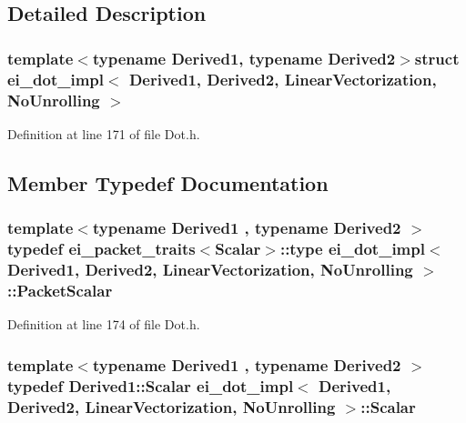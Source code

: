 \subsection{Detailed Description}
\subsubsection*{template$<$typename Derived1, typename Derived2$>$struct ei\-\_\-dot\-\_\-impl$<$ Derived1, Derived2, Linear\-Vectorization, No\-Unrolling $>$}



Definition at line 171 of file Dot.\-h.



\subsection{Member Typedef Documentation}
\hypertarget{structei__dot__impl_3_01_derived1_00_01_derived2_00_01_linear_vectorization_00_01_no_unrolling_01_4_aceef518270c80f1a170db132bd2c0122}{
\subsubsection[{Packet\-Scalar}]{\setlength{\rightskip}{0pt plus 5cm}template$<$typename Derived1 , typename Derived2 $>$ typedef {\bf ei\-\_\-packet\-\_\-traits}$<${\bf Scalar}$>$\-::{\bf type} {\bf ei\-\_\-dot\-\_\-impl}$<$ Derived1, Derived2, {\bf Linear\-Vectorization}, {\bf No\-Unrolling} $>$\-::{\bf Packet\-Scalar}}}\label{structei__dot__impl_3_01_derived1_00_01_derived2_00_01_linear_vectorization_00_01_no_unrolling_01_4_aceef518270c80f1a170db132bd2c0122}


Definition at line 174 of file Dot.\-h.

\hypertarget{structei__dot__impl_3_01_derived1_00_01_derived2_00_01_linear_vectorization_00_01_no_unrolling_01_4_aa59256107f5fdd82e36a0a9e3bcb199b}{
\subsubsection[{Scalar}]{\setlength{\rightskip}{0pt plus 5cm}template$<$typename Derived1 , typename Derived2 $>$ typedef Derived1\-::\-Scalar {\bf ei\-\_\-dot\-\_\-impl}$<$ Derived1, Derived2, {\bf Linear\-Vectorization}, {\bf No\-Unrolling} $>$\-::{\bf Scalar}}}\label{structei__dot__impl_3_01_derived1_00_01_derived2_00_01_linear_vectorization_00_01_no_unrolling_01_4_aa59256107f5fdd82e36a0a9e3bcb199b}


